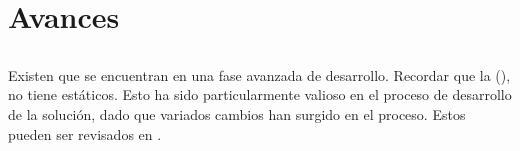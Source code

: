 \chapter{Avances}





%



\section{\dataModelAS}

Existen \dataModelsAS que se encuentran en una fase avanzada de desarrollo. Recordar que la \dataBaseDB (\mongodbNAME), no tiene \schemasDB estáticos. Esto ha sido particularmente valioso en el proceso de desarrollo de la solución, dado que variados cambios han surgido en el proceso. Estos \dataModelsAS pueden ser revisados en .

